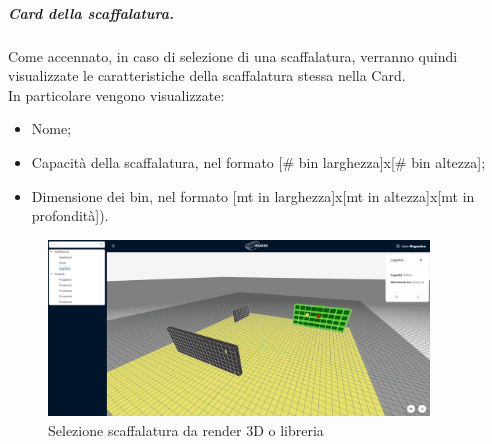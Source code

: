                 \subparagraph{Card della scaffalatura.}
                Come accennato, in caso di selezione di una scaffalatura, verranno quindi visualizzate le caratteristiche della scaffalatura stessa nella Card.  \\
                In particolare vengono visualizzate:
                \begin{itemize}
                    \item Nome;
                    \item Capacità della scaffalatura, nel formato [\# bin larghezza]x[\# bin altezza];
                    \item Dimensione dei bin, nel formato [mt in larghezza]x[mt in altezza]x[mt in profondità]).
                \end{itemize}
                \begin{figure}[H]
                    \centering
                    \includegraphics[width=0.9\textwidth]{images/selezione_scaffalatura.png}
                    \caption{Selezione scaffalatura da render 3D o libreria}
                \end{figure}

